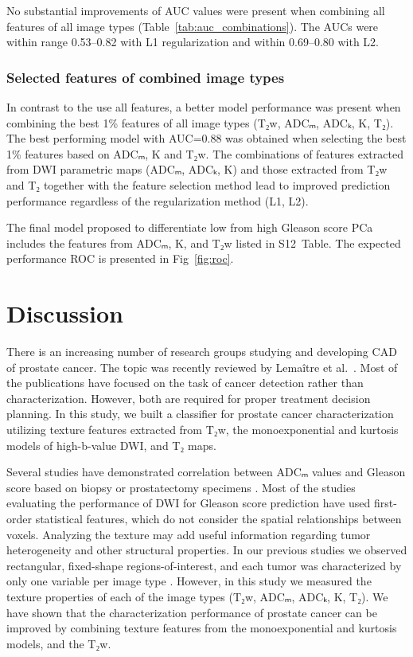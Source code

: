 \documentclass[10pt,letterpaper]{article}
\newcommand{\citep}{\cite}
\begin{document}
No substantial improvements of AUC values were present when combining all
features of all image types (Table~\ref{tab:auc_combinations}). The AUCs were
within range 0.53--0.82 with L1 regularization and within 0.69--0.80 with L2.


\subsubsection{Selected features of combined image types}

In contrast to the use all features, a better model performance was present when
combining the best 1\% features of all image types (T₂w, ADCₘ, ADCₖ, K,
T₂). The best performing model with AUC=0.88 was obtained when selecting the
best 1\% features based on ADCₘ, K and T₂w. The combinations of features
extracted from DWI parametric maps (ADCₘ, ADCₖ, K) and those extracted from T₂w
and T₂ together with the feature selection method lead to improved prediction
performance regardless of the regularization method (L1, L2).

The final model proposed to differentiate low from high Gleason score PCa
includes the features from ADCₘ, K, and T₂w listed in S12~Table. The expected
performance ROC is presented in Fig~\ref{fig:roc}.

%
\newpage
\section{Discussion}

There is an increasing number of research groups studying and developing CAD of
prostate cancer. The topic was recently reviewed by Lemaître et
al.\ \cite{Lemaitre2015}. Most of the publications have focused on the task of
cancer detection rather than characterization. However, both are required for
proper treatment decision planning. In this study, we built a classifier for
prostate cancer characterization utilizing texture features extracted from T₂w,
the monoexponential and kurtosis models of high-b-value DWI, and T₂ maps.

Several studies have demonstrated correlation between ADCₘ values and Gleason
score based on biopsy \citep{Turkbey2011, Tamada2008} or prostatectomy specimens
\citep{Toivonen2015, Peng2013, Boesen2015, Rosenkrantz2015, Donati2014}. Most of
the studies evaluating the performance of DWI for Gleason score prediction have
used first-order statistical features, which do not consider the spatial
relationships between voxels. Analyzing the texture may add useful information
regarding tumor heterogeneity and other structural properties. In our previous
studies we observed rectangular, fixed-shape regions-of-interest, and each tumor
was characterized by only one variable per image type \citep{Toivonen2015,
Jambor2015Relaxation, Jambor2015Rotating}. However, in this study we measured
the texture properties of each of the image types (T₂w, ADCₘ, ADCₖ, K, T₂).
We have shown that the characterization performance of prostate cancer can be
improved by combining texture features from the monoexponential and kurtosis
models, and the T₂w.
\end{document}
